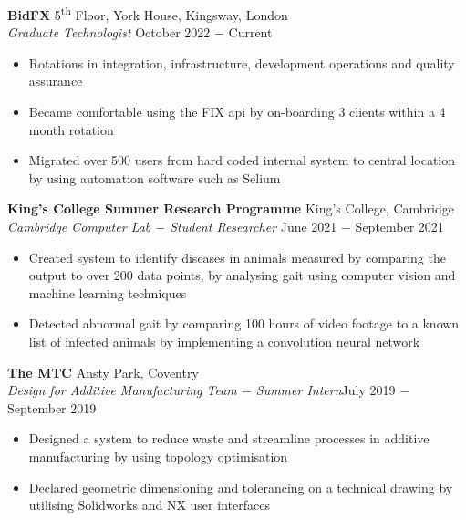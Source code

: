 \documentclass{article}
\begin{document}
\textbf{BidFX} \hfill 5\textsuperscript{th} Floor, York House, Kingsway, London\\
\textit{Graduate Technologist} \hfill October 2022 $-$ Current
\begin{itemize}
    \item Rotations in integration, infrastructure, development operations and quality assurance
    \item Became comfortable using the FIX api by on-boarding 3 clients within a 4 month rotation
    \item Migrated over 500 users from hard coded internal system to central location by using automation software such as Selium
\end{itemize} \medskip

\textbf{King's College Summer Research Programme} \hfill King's College, Cambridge \\
\textit{Cambridge Computer Lab $-$ Student Researcher} \hfill June 2021 $-$ September 2021
\begin{itemize}
    \item Created system to identify diseases in animals measured by comparing the output to over 200 data points, by analysing gait using computer vision and machine learning techniques
    \item Detected abnormal gait by comparing 100 hours of video footage to a known list of infected animals by implementing a convolution neural network 
\end{itemize} \medskip

\textbf{The MTC} \hfill Ansty Park, Coventry \\
\textit{Design for Additive Manufacturing Team $-$ Summer Intern}\hfill July 2019 $-$ September 2019
\begin{itemize}
    \item Designed a system to reduce waste and streamline processes in additive manufacturing by using topology optimisation
    \item Declared geometric dimensioning and tolerancing on a technical drawing by utilising Solidworks and NX user interfaces
\end{itemize} \medskip
\end{document}
